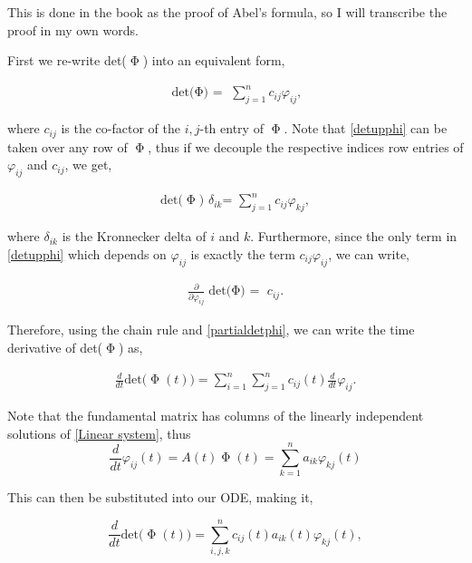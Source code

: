 \documentclass[12pt]{article}
\newcommand{\jump}{\vspace{5mm}}
\begin{document}
\begin{enumerate}[]
        \jump

        \begin{solution}
          
        This is done in the book as the proof of Abel's formula, so I will transcribe the proof in my own words. 

        \jump
        First we re-write det($\upPhi$) into an equivalent form, 
        
        \begin{align}
            \text{det($\upPhi$) = } \sum_{j = 1}^nc_{ij}\varphi_{ij}, \label{detupphi}
        \end{align}

        where $c_{ij}$ is the co-factor of the $i,j$-th entry of $\upPhi$. Note that \ref{detupphi} can be taken over any row of $\upPhi$, thus if we decouple the respective indices row entries of $\varphi_{ij}$ and $c_{ij}$, we get,

        \begin{align}
             \text{det($\upPhi$) $\delta_{ik}$= } \sum_{j = 1}^nc_{ij}\varphi_{kj}, \label{deltadetupphi}
        \end{align}

        where $\delta_{ik}$ is the Kronnecker delta of $i$ and $k$. Furthermore, since the only term in \ref{detupphi} which depends on $\varphi_{ij}$ is exactly the term $c_{ij}\varphi_{ij}$, we can write,

        \begin{align}
            \frac{\partial}{\partial\varphi_{ij}}\text{det($\upPhi$) = }c_{ij}. \label{partialdetphi}
        \end{align}

        Therefore, using the chain rule and \ref{partialdetphi}, we can write the time derivative of det($\upPhi$) as,

        \begin{align*}
            \frac{d}{dt}\text{det($\upPhi(t)$)} = \sum_{i = 1}^n\sum_{j = 1}^n c_{ij}(t)\frac{d}{dt}\varphi_{ij}.
        \end{align*}

        Note that the fundamental matrix has columns of the linearly independent solutions of \ref{Linear system}, thus 
        \[
        \frac{d}{dt}\varphi_{ij}(t) = A(t)\upPhi(t) = \sum_{k = 1}^n a_{ik}\varphi_{kj}(t)
        \]

        This can then be substituted into our ODE, making it,

        \[
        \frac{d}{dt}\text{det($\upPhi(t)$)} = \sum_{i, j, k}^n c_{ij}(t)a_{ik}(t)\varphi_{kj}(t),
        \]


\end{solution}
\end{enumerate}
\end{document}
